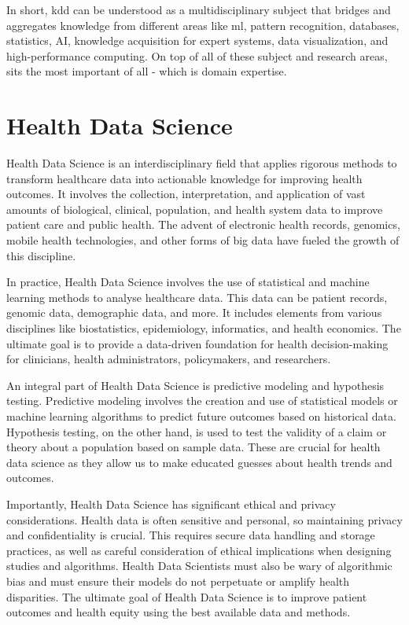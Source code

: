 In short, \ac{kdd} can be understood as a multidisciplinary subject that bridges and aggregates knowledge from different areas like \ac{ml}, pattern recognition, databases, statistics, AI, knowledge acquisition for expert systems, data visualization, and high-performance computing. On top of all of these subject and research areas, sits the most important of all - which is domain expertise.



\section{Health Data Science}
Health Data Science is an interdisciplinary field that applies rigorous methods to transform healthcare data into actionable knowledge for improving health outcomes. It involves the collection, interpretation, and application of vast amounts of biological, clinical, population, and health system data to improve patient care and public health. The advent of electronic health records, genomics, mobile health technologies, and other forms of big data have fueled the growth of this discipline.

In practice, Health Data Science involves the use of statistical and machine learning methods to analyse healthcare data. This data can be patient records, genomic data, demographic data, and more. It includes elements from various disciplines like biostatistics, epidemiology, informatics, and health economics. The ultimate goal is to provide a data-driven foundation for health decision-making for clinicians, health administrators, policymakers, and researchers.

An integral part of Health Data Science is predictive modeling and hypothesis testing. Predictive modeling involves the creation and use of statistical models or machine learning algorithms to predict future outcomes based on historical data. Hypothesis testing, on the other hand, is used to test the validity of a claim or theory about a population based on sample data. These are crucial for health data science as they allow us to make educated guesses about health trends and outcomes.

Importantly, Health Data Science has significant ethical and privacy considerations. Health data is often sensitive and personal, so maintaining privacy and confidentiality is crucial. This requires secure data handling and storage practices, as well as careful consideration of ethical implications when designing studies and algorithms. Health Data Scientists must also be wary of algorithmic bias and must ensure their models do not perpetuate or amplify health disparities. The ultimate goal of Health Data Science is to improve patient outcomes and health equity using the best available data and methods.


